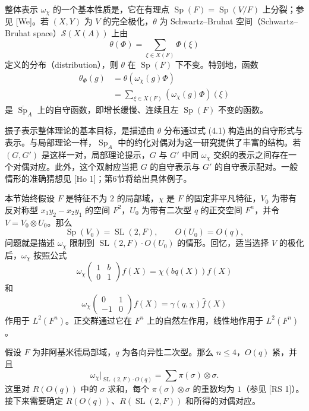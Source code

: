 整体表示 $\omega_\chi$ 的一个基本性质是，它在有理点 $\operatorname{Sp}(F)=\operatorname{Sp}(V/F)$ 上分裂；参见 [We]。若 $(X,Y)$ 为 $V$ 的完全极化，$\theta$ 为 Schwartz--Bruhat 空间（Schwartz--Bruhat space）$\mathcal S(X(A))$ 上由
\[
 \theta(\Phi)=\sum_{\xi\in X(F)}\Phi(\xi)
\]
定义的分布（distribution），则 $\theta$ 在 $\operatorname{Sp}(F)$ 下不变。特别地，函数
\begin{equation}
\begin{split}
 \theta_\Phi(g)&=\theta(\omega_\chi(g)\Phi)\\
 &=\sum_{\xi\in X(F)}(\omega_\chi(g)\Phi)(\xi)
\end{split}\tag{4.1}
\end{equation}
是 $\overline{\operatorname{Sp}}_A$ 上的自守函数，即增长缓慢、连续且左 $\operatorname{Sp}(F)$ 不变的函数。

振子表示整体理论的基本目标，是描述由 $\theta$ 分布通过式 (4.1) 构造出的自守形式与表示。与局部理论一样，$\operatorname{Sp}_A$ 中的约化对偶对为这一研究提供了丰富的结构。若 $(G,G')$ 是这样一对，局部理论提示，$G$ 与 $G'$ 中同 $\omega_\chi$ 交织的表示之间存在一个对偶对应。此外，这个双射应当把 $G$ 的自守表示与 $G'$ 的自守表示配对。一般情形的准确猜想见 [Ho 1]；第6节将给出具体例子。

本节始终假设 $F$ 是特征不为 $2$ 的局部域，$\chi$ 是 $F$ 的固定非平凡特征，$V_0$ 为带有反对称型 $x_1y_2-x_2y_1$ 的空间 $F^2$，$U_0$ 为带有二次型 $q$ 的正交空间 $F^n$，并令 $V=V_0\otimes U_0$。那么
\[
 \operatorname{Sp}(V_0)=\operatorname{SL}(2,F),\qquad O(U_0)=O(q),
\]
问题就是描述 $\omega_\chi$ 限制到 $\operatorname{SL}(2,F)\cdot O(U_0)$ 的情形。回忆，适当选择 $V$ 的极化后，$\omega_\chi$ 按照公式
\begin{equation}
 \omega_\chi\!\begin{pmatrix}1&b\\0&1\end{pmatrix}f(X)
 =\chi(bq(X))f(X)\tag{5.1}
\end{equation}
和
\begin{equation}
 \omega_\chi\!\begin{pmatrix}0&1\\-1&0\end{pmatrix}f(X)
 =\gamma(q,\chi)\widehat f(X)\tag{5.2}
\end{equation}
作用于 $L^2(F^n)$。正交群通过它在 $F^n$ 上的自然左作用，线性地作用于 $L^2(F^n)$。

假设 $F$ 为非阿基米德局部域，$q$ 为各向异性二次型。那么 $n\le4$，$O(q)$ 紧，并且
\begin{equation}
 \omega_\chi|_{\operatorname{SL}(2,F)\cdot O(q)}
 =\sum\pi(\sigma)\otimes\sigma.\tag{5.3}
\end{equation}
这里对 $R(O(q))$ 中的 $\sigma$ 求和，每个 $\pi(\sigma)\otimes\sigma$ 的重数均为 $1$（参见 [RS 1]）。接下来需要确定 $R(O(q))$、$R(\operatorname{SL}(2,F))$ 和所得的对偶对应。

